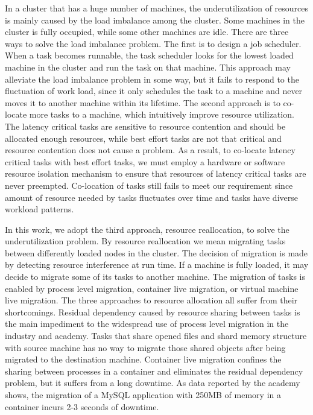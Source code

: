 \begin{bigabstract}
In a cluster that has a huge number of machines, the underutilization of resources is mainly caused by the load imbalance among the cluster. Some machines in the cluster is fully occupied, while some other machines are idle. There are three ways to solve the load imbalance problem. The first is to design a job scheduler. When a task becomes runnable, the task scheduler looks for the lowest loaded machine in the cluster and run the task on that machine. This approach may alleviate the load imbalance problem in some way, but it fails to respond to the fluctuation of work load, since it only schedules the task to a machine and never moves it to another machine within its lifetime. The second approach is to co-locate more tasks to a machine, which intuitively improve resource utilization. The latency critical tasks are sensitive to resource contention and should be allocated enough resources, while best effort tasks are not that critical and resource contention does not cause a problem. As a result, to co-locate latency critical tasks with best effort tasks, we must employ a hardware or software resource isolation mechanism to ensure that resources of latency critical tasks are never preempted. Co-location of tasks still fails to meet our requirement since amount of resource needed by tasks fluctuates over time and tasks have diverse workload patterns. 

In this work, we adopt the third approach, resource reallocation, to solve the underutilization problem. By resource reallocation we mean migrating tasks between differently loaded nodes in the cluster. The decision of migration is made by detecting resource interference at run time. If a machine is fully loaded, it may decide to migrate some of its tasks to another machine. The migration of tasks is enabled by process level migration, container live migration, or virtual machine live migration. The three approaches to resource allocation all suffer from their shortcomings. Residual dependency caused by resource sharing between tasks is the main impediment to the widespread use of process level migration in the industry and academy. Tasks that share opened files and shard memory structure with source machine has no way to migrate those shared objects after being migrated to the destination machine. Container live migration confines the sharing between processes in a container and eliminates the residual dependency problem, but it suffers from a long downtime. As data reported by the academy shows, the migration of a MySQL application with 250MB of memory in a container incurs 2-3 seconds of downtime.


\end{bigabstract}

